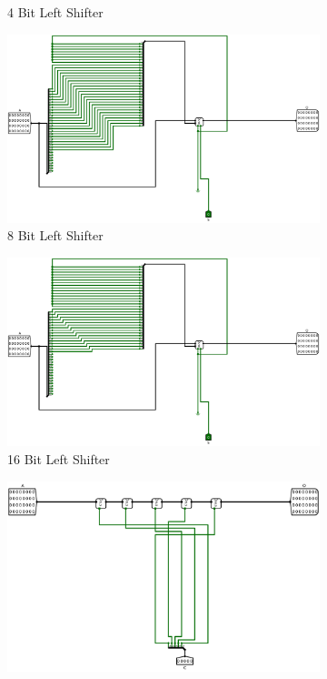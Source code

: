 \documentclass[12pt]{article}
\begin{document}
\begin{figure}[H]
\begin{subfigure}[b]{0.3\textwidth}
        \caption{4 Bit Left Shifter}
        \label{fig:4leftshift}
    \end{subfigure}
    \newline
    \newline
    \begin{subfigure}[b]{0.3\textwidth}
        \includegraphics[width=\textwidth]{Images/8LeftShift.png}
        \caption{8 Bit Left Shifter}
        \label{fig:8leftshift}
    \end{subfigure}
    \hfill
    \begin{subfigure}[b]{0.3\textwidth}
        \includegraphics[width=\textwidth]{Images/16LeftShift.png}
        \caption{16 Bit Left Shifter}
        \label{fig:16leftshift}
    \end{subfigure}
    \hfill
    \begin{subfigure}[b]{0.3\textwidth}
        \includegraphics[width=\textwidth]{Images/ArbLeftShift.png}

\end{subfigure}
\end{figure}
\end{document}
